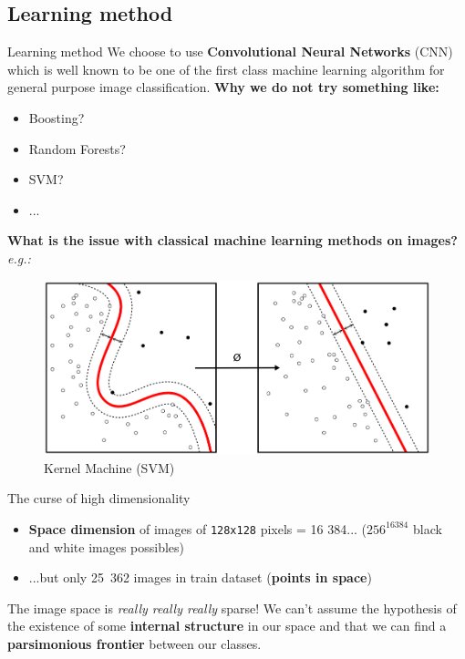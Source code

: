 \subsection{Learning method} 
\begin{frame}[c]{Learning method}
    We choose to use \textbf{Convolutional Neural Networks} (CNN) which is well known\cite{NIPS2012_4824} to be one of the first class machine learning algorithm for general purpose image classification.
    \newline\newline
    \textbf{Why we do not try something like:}
    \begin{itemize}
        \item Boosting?
        \item Random Forests?
        \item SVM?
        \item ...
    \end{itemize}
\end{frame}

\begin{frame}[c]
    \textbf{What is the issue with classical machine learning methods on images?} \emph{e.g.:}
    \begin{figure}
        \includegraphics[width=\linewidth]{Kernel_Machine.png}
        \caption{Kernel Machine (SVM)}
   \end{figure}
\end{frame}

\begin{frame}[c]{The curse of high dimensionality}
    \begin{itemize}
        \item \textbf{Space dimension} of images of \texttt{128x128} pixels = \Large 16 384... \normalsize ($256^{16 384}$ black and white images possibles)
        \item ...but only \Large 25 362 \normalsize  images in train dataset (\textbf{points in space})
    \end{itemize}
    \bigskip
    \Large The image space is \emph{really really really} sparse!
    \newline\newline
    \normalsize We can't assume the hypothesis of the existence of some \textbf{internal structure} in our space and that we can find a \textbf{parsimonious frontier} between our classes.
\end{frame}

